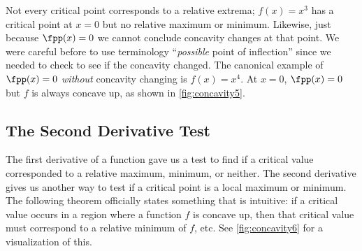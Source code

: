 Not every critical point corresponds to a relative extrema; $f(x)=x^3$ has a critical point at $x=0$ but no relative maximum or minimum. Likewise, just because $\fpp(x)=0$ we cannot conclude concavity changes at that point. We were careful before to use terminology ``\emph{possible} point of inflection'' since we needed to check to see if the concavity changed. The canonical example of $\fpp(x)=0$ \emph{without} concavity changing is $f(x)=x^4$. At $x=0$, $\fpp(x)=0$ but $f$ is always concave up, as shown in \autoref{fig:concavity5}.



\subsection{The Second Derivative Test}

The first derivative of a function gave us a test to find if a critical value corresponded to a relative maximum, minimum, or neither. The second derivative gives us another way to test if a critical point is a local maximum or minimum. The following theorem officially states something that is intuitive: if a critical value occurs in a region where a function $f$ is concave up, then that critical value must correspond to a relative minimum of $f$, etc. See \autoref{fig:concavity6} for a visualization of this.

